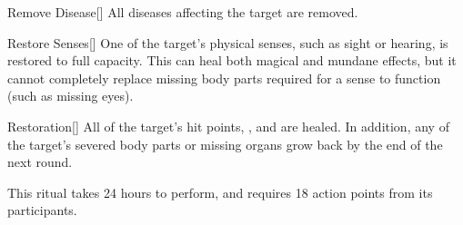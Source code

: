 \lowercase{\hypertarget{spell:Remove Disease}{}}\label{spell:Remove Disease}
\begin{apability}[Rank 3]{\hypertarget{spell:Remove Disease}{Remove Disease}}[]
All diseases affecting the target are removed.
\end{apability}
\vspace{0.25em}



\lowercase{\hypertarget{spell:Restore Senses}{}}\label{spell:Restore Senses}
\begin{apability}[Rank 3]{\hypertarget{spell:Restore Senses}{Restore Senses}}[]
One of the target's physical senses, such as sight or hearing, is restored to full capacity.
This can heal both magical and mundane effects, but it cannot completely replace missing body parts required for a sense to function (such as missing eyes).
\end{apability}
\vspace{0.25em}



\lowercase{\hypertarget{spell:Restoration}{}}\label{spell:Restoration}
\begin{apability}[Rank 4]{\hypertarget{spell:Restoration}{Restoration}}[]
All of the target's hit points, , and  are healed.
In addition, any of the target's severed body parts or missing organs grow back by the end of the next round.

This ritual takes 24 hours to perform, and requires 18 action points from its participants.
\end{apability}
\vspace{0.25em}



